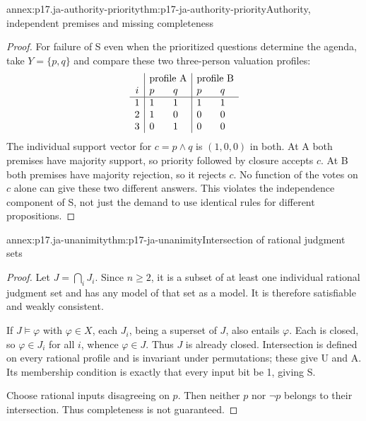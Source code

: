 \begin{annexitem}{annex:p17.ja-authority-priority}{thm:p17-ja-authority-priority}{Authority, independent premises and missing completeness}
\begin{proof}
For failure of S even when the prioritized questions determine the agenda,
take \(Y=\{p,q\}\) and compare these two three-person valuation profiles:
\[
 \begin{array}{c|cc|cc}
 &\multicolumn{2}{c|}{\text{profile A}}&\multicolumn{2}{c}{\text{profile B}}\\
 i&p&q&p&q\\ \hline
 1&1&1&1&1\\
 2&1&0&0&0\\
 3&0&1&0&0
 \end{array}
\]
The individual support vector for \(c=p\land q\) is \((1,0,0)\) in both.
At A both premises have majority support, so priority followed by closure
accepts \(c\). At B both premises have majority rejection, so it rejects
\(c\). No function of the votes on \(c\) alone can give these two different
answers. This violates the independence component of S, not just the demand
to use identical rules for different propositions.
\end{proof}
\end{annexitem}

\begin{annexitem}{annex:p17.ja-unanimity}{thm:p17-ja-unanimity}{Intersection of rational judgment sets}
\begin{proof}
Let \(J=\bigcap_iJ_i\). Since \(n\geq2\), it is a subset of at least one
individual rational judgment set and has any model of that set as a model.
It is therefore satisfiable and weakly consistent.

If \(J\models\varphi\) with \(\varphi\in X\), each \(J_i\), being a
superset of \(J\), also entails \(\varphi\). Each is closed, so
\(\varphi\in J_i\) for all \(i\), whence \(\varphi\in J\).
Thus \(J\) is already closed. Intersection is defined on every rational
profile and is invariant under permutations; these give U and A. Its membership
condition is exactly that every input bit be 1, giving S.

Choose rational inputs disagreeing on \(p\). Then neither \(p\) nor
\(\neg p\) belongs to their intersection. Thus completeness is not guaranteed.
\end{proof}
\end{annexitem}

